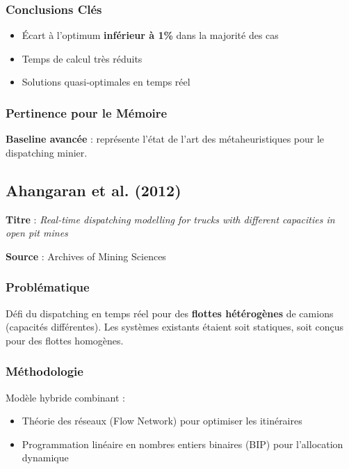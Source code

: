\documentclass[12pt,a4paper]{article}
\begin{document}
\subsubsection{Conclusions Cl\'es}

\begin{itemize}
    \item \'Ecart \`a l'optimum \textbf{inf\'erieur \`a 1\%} dans la majorit\'e des cas
    \item Temps de calcul tr\`es r\'eduits
    \item Solutions quasi-optimales en temps r\'eel
\end{itemize}

\subsubsection{Pertinence pour le M\'emoire}

\textbf{Baseline avanc\'ee} : repr\'esente l'\'etat de l'art des m\'etaheuristiques pour le dispatching minier.

\subsection{Ahangaran et al. (2012)}

\textbf{Titre} : \textit{Real-time dispatching modelling for trucks with different capacities in open pit mines}

\textbf{Source} : Archives of Mining Sciences

\subsubsection{Probl\'ematique}

D\'efi du dispatching en temps r\'eel pour des \textbf{flottes h\'et\'erog\`enes} de camions (capacit\'es diff\'erentes). Les syst\`emes existants \'etaient soit statiques, soit con\c{c}us pour des flottes homog\`enes.

\subsubsection{M\'ethodologie}

Mod\`ele hybride combinant :
\begin{itemize}
    \item Th\'eorie des r\'eseaux (Flow Network) pour optimiser les itin\'eraires
    \item Programmation lin\'eaire en nombres entiers binaires (BIP) pour l'allocation dynamique
\end{itemize}
\end{document}
